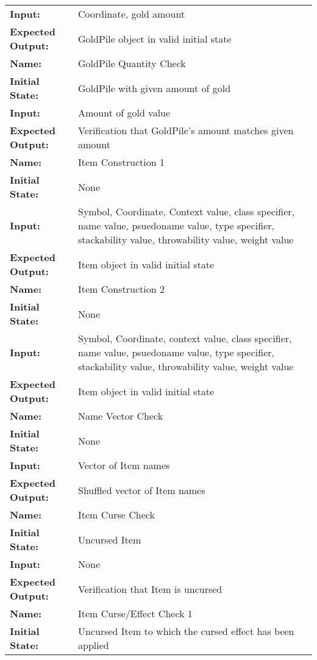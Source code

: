 \documentclass[12pt, titlepage]{article}
\begin{document}
\begin{center}
\begin{longtable}{ l | p{10cm} }
				\textbf{Input:} & Coordinate, gold amount\\
				\textbf{Expected Output:} & GoldPile object in valid initial state\\[0.6em]
				\hline
				\rule{0pt}{1.5em}\textbf{Name:} & GoldPile Quantity Check\\
				\textbf{Initial State:} & GoldPile with given amount of gold\\
				\textbf{Input:} & Amount of gold value\\
				\textbf{Expected Output:} & Verification that GoldPile's amount matches given amount\\[0.6em]
				\hline
				\rule{0pt}{1.5em}\textbf{Name:} & Item Construction 1\\
				\textbf{Initial State:} & None\\
				\textbf{Input:} & Symbol, Coordinate, Context value, class specifier, name value, psuedoname value, type specifier, stackability value, throwability value, weight value\\
				\textbf{Expected Output:} & Item object in valid initial state\\[0.6em]
				\hline
				\rule{0pt}{1.5em}\textbf{Name:} & Item Construction 2\\
				\textbf{Initial State:} & None\\
				\textbf{Input:} & Symbol, Coordinate, context value, class specifier, name value, psuedoname value, type specifier, stackability value, throwability value, weight value\\
				\textbf{Expected Output:} & Item object in valid initial state\\[0.6em]
				\hline
				\rule{0pt}{1.5em}\textbf{Name:} & Name Vector Check\\
				\textbf{Initial State:} & None\\
				\textbf{Input:} & Vector of Item names\\
				\textbf{Expected Output:} & Shuffled vector of Item names\\[0.6em]
				\hline
				\rule{0pt}{1.5em}\textbf{Name:} & Item Curse Check\\
				\textbf{Initial State:} & Uncursed Item\\
				\textbf{Input:} & None\\
				\textbf{Expected Output:} & Verification that Item is uncursed\\[0.6em]
				\hline
				\rule{0pt}{1.5em}\textbf{Name:} & Item Curse/Effect Check 1\\
				\textbf{Initial State:} & Uncursed Item to which the cursed effect has been applied\\

\end{longtable}
\end{center}
\end{document}
